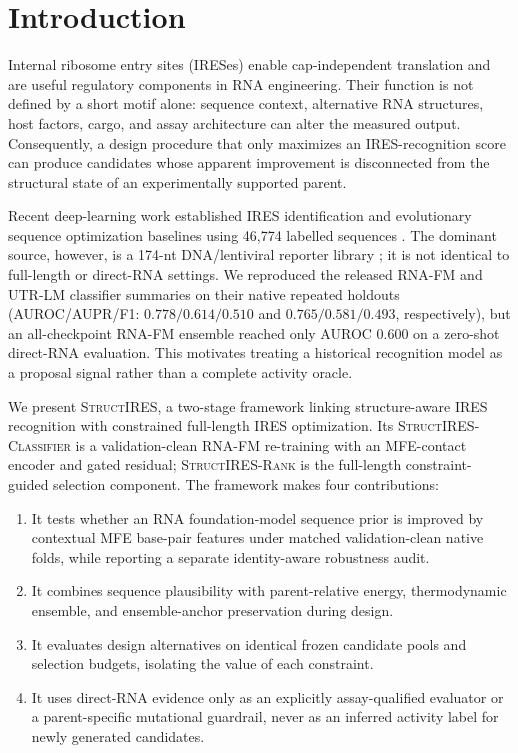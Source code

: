 \section{Introduction}

Internal ribosome entry sites (IRESes) enable cap-independent translation and
are useful regulatory components in RNA engineering. Their function is not
defined by a short motif alone: sequence context, alternative RNA structures,
host factors, cargo, and assay architecture can alter the measured output.
Consequently, a design procedure that only maximizes an IRES-recognition score
can produce candidates whose apparent improvement is disconnected from the
structural state of an experimentally supported parent.

Recent deep-learning work established IRES identification and evolutionary
sequence optimization baselines using 46,774 labelled sequences
\cite{chu2026iresai}. The dominant source, however, is a 174-nt
DNA/lentiviral reporter library \cite{weingarten2016ires}; it is not identical
to full-length or direct-RNA settings. We reproduced the released RNA-FM and
UTR-LM classifier summaries on their native repeated holdouts
(AUROC/AUPR/F1: $0.778/0.614/0.510$ and $0.765/0.581/0.493$,
respectively), but an all-checkpoint RNA-FM ensemble reached only AUROC 0.600
on a zero-shot direct-RNA evaluation. This motivates treating a historical
recognition model as a proposal signal rather than a complete activity oracle.

We present \textsc{StructIRES}, a two-stage framework linking structure-aware
IRES recognition with constrained full-length IRES optimization. Its
\textsc{StructIRES-Classifier} is a validation-clean RNA-FM re-training with
an MFE-contact encoder and gated residual; \textsc{StructIRES-Rank} is the
full-length constraint-guided selection component. The framework makes four
contributions:
\begin{enumerate}
  \item It tests whether an RNA foundation-model sequence prior is improved by
  contextual MFE base-pair features under matched validation-clean native
  folds, while reporting a separate identity-aware robustness audit.
  \item It combines sequence plausibility with parent-relative energy,
  thermodynamic ensemble, and ensemble-anchor preservation during design.
  \item It evaluates design alternatives on identical frozen candidate pools and
  selection budgets, isolating the value of each constraint.
  \item It uses direct-RNA evidence only as an explicitly assay-qualified
  evaluator or a parent-specific mutational guardrail, never as an inferred
  activity label for newly generated candidates.
\end{enumerate}

